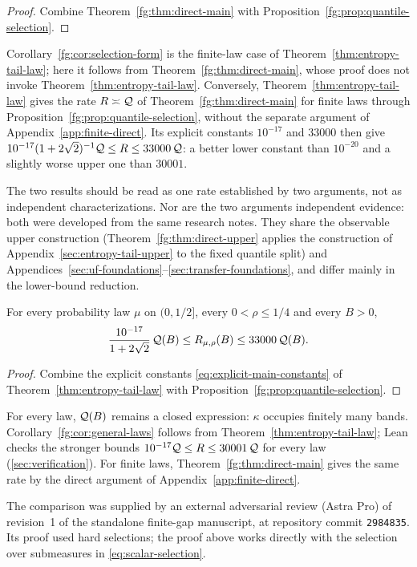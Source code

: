 \begin{proof}
Combine Theorem~\ref{fg:thm:direct-main} with
Proposition~\ref{fg:prop:quantile-selection}.
\end{proof}

Corollary~\ref{fg:cor:selection-form} is the finite-law case of
Theorem~\ref{thm:entropy-tail-law}; here it follows from
Theorem~\ref{fg:thm:direct-main}, whose proof does not invoke
Theorem~\ref{thm:entropy-tail-law}. Conversely,
Theorem~\ref{thm:entropy-tail-law} gives the rate $R\asymp\mathcal Q$ of
Theorem~\ref{fg:thm:direct-main} for finite laws through
Proposition~\ref{fg:prop:quantile-selection}, without the separate
argument of Appendix~\ref{app:finite-direct}. Its explicit constants $10^{-17}$ and $33000$ then give
$10^{-17}(1+2\sqrt2)^{-1}\mathcal Q\le R\le33000\,\mathcal Q$: a better lower constant
than $10^{-20}$ and a slightly worse upper one than $30001$.

The two results should be read as one rate established by two
arguments, not as independent characterizations. Nor are the two
arguments independent evidence: both were developed from the same
research notes. They share the observable upper construction
(Theorem~\ref{fg:thm:direct-upper} applies the construction of
Appendix~\ref{sec:entropy-tail-upper} to the fixed quantile split) and
Appendices~\ref{sec:uf-foundations}--\ref{sec:transfer-foundations}, and
differ mainly in the lower-bound reduction.

\begin{corollary}\label{fg:cor:general-laws}
For every probability law $\mu$ on $(0,1/2]$, every $0<\rho\le1/4$ and
every $B>0$,
\[
 \frac{10^{-17}}{1+2\sqrt2}\,\mathcal Q(B)\le R_{\mu,\rho}(B)\le33000\,\mathcal Q(B).
\]
\end{corollary}

\begin{proof}
Combine the explicit constants \eqref{eq:explicit-main-constants} of
Theorem~\ref{thm:entropy-tail-law} with
Proposition~\ref{fg:prop:quantile-selection}.
\end{proof}

For every law, $\mathcal Q(B)$ remains a closed expression: $\kappa$ occupies
finitely many bands. Corollary~\ref{fg:cor:general-laws} follows from
Theorem~\ref{thm:entropy-tail-law}; Lean checks the stronger bounds
$10^{-17}\mathcal Q\le R\le30001\,\mathcal Q$ for every law (\cref{sec:verification}). For finite laws,
Theorem~\ref{fg:thm:direct-main} gives the same rate by the direct
argument of Appendix~\ref{app:finite-direct}.

The comparison was supplied by an external adversarial review (Astra
Pro) of revision~1 of the standalone finite-gap manuscript, at repository
commit \texttt{2984835}. Its proof used hard selections; the proof above
works directly with the selection over submeasures in
\eqref{eq:scalar-selection}.
